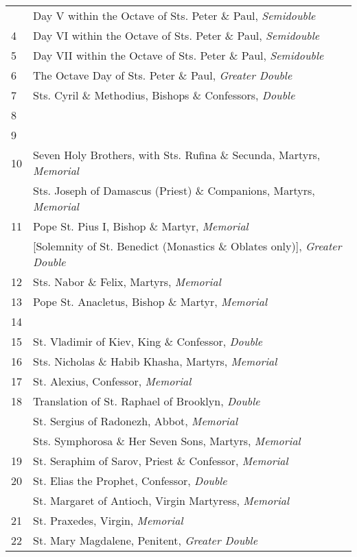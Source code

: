 \begin{longtable}{p{2mm}|p{94mm}}
&Day V within the Octave of Sts. Peter \& Paul, \textit{Semidouble}\\
4&Day VI within the Octave of Sts. Peter \& Paul, \textit{Semidouble}\\
5&Day VII within the Octave of Sts. Peter \& Paul, \textit{Semidouble}\\
6&The Octave Day of Sts. Peter \& Paul, \textit{Greater Double}\\
7&Sts. Cyril \& Methodius, Bishops \& Confessors, \textit{Double}\\
8&\\
9&\\
10&Seven Holy Brothers, with Sts. Rufina \& Secunda, Martyrs, \textit{Memorial}\\
&Sts. Joseph of Damascus (Priest) \& Companions, Martyrs, \textit{Memorial}\\
11&Pope St. Pius I, Bishop \& Martyr, \textit{Memorial}\\
&[Solemnity of St. Benedict (Monastics \& Oblates only)], \textit{Greater Double}\\
12&Sts. Nabor \& Felix, Martyrs, \textit{Memorial}\\
13&Pope St. Anacletus, Bishop \& Martyr, \textit{Memorial}\\
14&\\
15&St. Vladimir of Kiev, King \& Confessor, \textit{Double}\\
16&Sts. Nicholas \& Habib Khasha, Martyrs, \textit{Memorial}\\
17&St. Alexius, Confessor, \textit{Memorial}\\
18&Translation of St. Raphael of Brooklyn, \textit{Double}\\
&St. Sergius of Radonezh, Abbot, \textit{Memorial}\\
&Sts. Symphorosa \& Her Seven Sons, Martyrs, \textit{Memorial}\\
19&St. Seraphim of Sarov, Priest \& Confessor, \textit{Memorial}\\
20&St. Elias the Prophet, Confessor, \textit{Double}\\
&St. Margaret of Antioch, Virgin Martyress, \textit{Memorial}\\
21&St. Praxedes, Virgin, \textit{Memorial}\\
22&{\color{RubricRed}St. Mary Magdalene, Penitent}, \textit{Greater Double}\\

\end{longtable}
